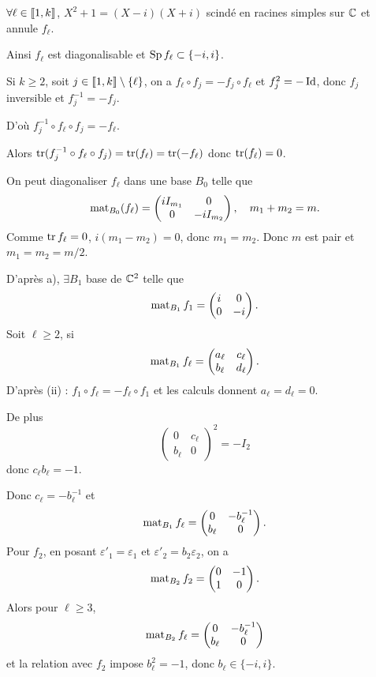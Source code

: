 \begin{solution}
$\forall \ell\in\llbracket 1,k\rrbracket$, $X^2+1=(X-i)(X+i)$ scindé en racines
simples sur $\mathbb C$ et annule $f_\ell$.

Ainsi $f_\ell$ est diagonalisable et $\operatorname{Sp} f_\ell\subset\{-i,i\}$.

Si $k\geq2$, soit $j\in\llbracket 1,k\rrbracket\setminus\{\ell\}$, on a
$f_\ell\circ f_j=-f_j\circ f_\ell$ et $f_j^2=-\operatorname{Id}$, donc $f_j$ inversible et
$f_j^{-1}=-f_j$.

D'où $f_j^{-1}\circ f_\ell\circ f_j=-f_\ell$.

Alors $\operatorname{tr}(f_j^{-1}\circ f_\ell\circ f_j)=\operatorname{tr}(f_\ell)=\operatorname{tr}(-f_\ell)$ donc
$\operatorname{tr}(f_\ell)=0$.

On peut diagonaliser $f_\ell$ dans une base $B_0$ telle que
\[
\operatorname{mat}_{B_0}(f_\ell)=
\begin{pmatrix}iI_{m_1}&0\\0&-iI_{m_2}\end{pmatrix},
\quad m_1+m_2=m.
\]
Comme $\operatorname{tr} f_\ell=0$, $i(m_1-m_2)=0$, donc $m_1=m_2$.
Donc $m$ est pair et $m_1=m_2=m/2$.

D'après a), $\exists B_1$ base de $\mathbb C^2$ telle que
\[
\operatorname{mat}_{B_1}f_1=\begin{pmatrix}i&0\\0&-i\end{pmatrix}.
\]
Soit $\ell\geq2$, si
\[
\operatorname{mat}_{B_1}f_\ell=\begin{pmatrix}a_\ell&c_\ell\\b_\ell&d_\ell\end{pmatrix}.
\]
D'après (ii) : $f_1\circ f_\ell=-f_\ell\circ f_1$ et les calculs donnent
$a_\ell=d_\ell=0$.

De plus
\[
\begin{pmatrix}0&c_\ell\\b_\ell&0\end{pmatrix}^2=-I_2
\]
donc $c_\ell b_\ell=-1$.

Donc $c_\ell=-b_\ell^{-1}$ et
\[
\operatorname{mat}_{B_1}f_\ell=\begin{pmatrix}0&-b_\ell^{-1}\\b_\ell&0\end{pmatrix}.
\]
Pour $f_2$, en posant $\varepsilon'_1=\varepsilon_1$ et
$\varepsilon'_2=b_2\varepsilon_2$, on a
\[
\operatorname{mat}_{B_2}f_2=\begin{pmatrix}0&-1\\1&0\end{pmatrix}.
\]
Alors pour $\ell\geq3$,
\[
\operatorname{mat}_{B_2}f_\ell=\begin{pmatrix}0&-b_\ell^{-1}\\b_\ell&0\end{pmatrix}
\]
et la relation avec $f_2$ impose $b_\ell^2=-1$, donc
$b_\ell\in\{-i,i\}$.


\end{solution}
